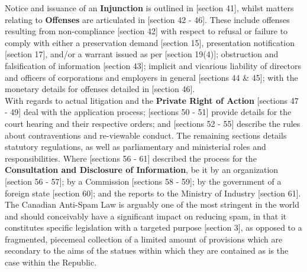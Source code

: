 \documentclass[11pt]{article}
\begin{document}
Notice and issuance of an \textbf{Injunction} is outlined in [section
41]\cite{ca10_anti_spam_act}, whilst matters relating to \textbf{Offenses} are
articulated in [section 42 - 46]\cite{ca10_anti_spam_act}. These include offenses
resulting from non-compliance [section 42]\cite{ca10_anti_spam_act} with respect
to refusal or failure to comply with either a preservation demand [section
15]\cite{ca10_anti_spam_act}, presentation notification [section
17]\cite{ca10_anti_spam_act}, and/or a warrant issued as per [section
19(4)]\cite{ca10_anti_spam_act}; obstruction and falsification of information
[section 43]; implicit and vicarious liability of directors and officers of
corporations and employers in general [sections 44 \& 45]\cite{ca10_anti_spam_act};
with the monetary details for offenses detailed in [section
46]\cite{ca10_anti_spam_act}.\\

With regards to actual litigation and the \textbf{Private Right of Action} [sections
47 - 49]\cite{ca10_anti_spam_act} deal with the application process; [sections
50 - 51]\cite{ca10_anti_spam_act} provide details for the court hearing and their
respective orders; and [sections 52 - 55]\cite{ca10_anti_spam_act} describe the
rules about contraventions and re-viewable conduct. The remaining sections
details statutory regulations, as well as parliamentary and ministerial roles
and responsibilities. Where [sections 56 - 61]\cite{ca10_anti_spam_act} described
the process for the \textbf{Consultation and Disclosure of Information}, be it by an
organization [section 56 - 57]\cite{ca10_anti_spam_act}; by a Commission [sections
58 - 59]\cite{ca10_anti_spam_act}; by the government of a foreign state [section
60]\cite{ca10_anti_spam_act}; and the reports to the Ministry of Industry [section
61]\cite{ca10_anti_spam_act}.\\

The Canadian Anti-Spam Law \cite{ca10_anti_spam_act} is arguably one of the most
stringent in the world and should conceivably have a significant impact on
reducing spam, in that it constitutes specific legislation with a targeted
purpose [section 3]\cite{ca10_anti_spam_act}, as opposed to a fragmented,
piecemeal collection of a limited amount of provisions
\cite{hermann14_direct_marketing_vs_spam,tladi08_reg_unsol_comm} which are secondary to the aims of the
statues within which they are contained
\cite{rsa02_elect_comm_trans_act,rsa12_elect_comm_trans_amend_bill,rsa08_cpa,rsa13_popi}
as is the case within the Republic.
\end{document}
